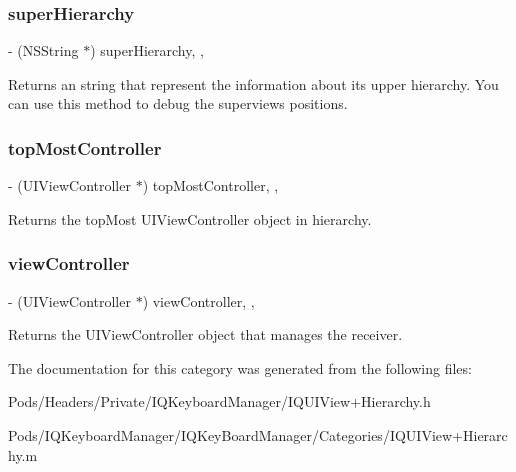 \subsubsection{\texorpdfstring{super\+Hierarchy}{superHierarchy}}
{\footnotesize\ttfamily -\/ (N\+S\+String $\ast$) super\+Hierarchy\hspace{0.3cm}{\ttfamily [read]}, {\ttfamily [nonatomic]}, {\ttfamily [copy]}}

Returns an string that represent the information about it\textquotesingle{}s upper hierarchy. You can use this method to debug the superview\textquotesingle{}s positions. \mbox{\label{category_u_i_view_07_i_q___u_i_view___hierarchy_08_afa4722598f368a57d40b54ab60332604}} 
\subsubsection{\texorpdfstring{top\+Most\+Controller}{topMostController}}
{\footnotesize\ttfamily -\/ (U\+I\+View\+Controller $\ast$) top\+Most\+Controller\hspace{0.3cm}{\ttfamily [read]}, {\ttfamily [nonatomic]}, {\ttfamily [strong]}}

Returns the top\+Most U\+I\+View\+Controller object in hierarchy. \mbox{\label{category_u_i_view_07_i_q___u_i_view___hierarchy_08_a3b2875c16bd6e5e31ee571c1a0236dac}} 
\subsubsection{\texorpdfstring{view\+Controller}{viewController}}
{\footnotesize\ttfamily -\/ (U\+I\+View\+Controller $\ast$) view\+Controller\hspace{0.3cm}{\ttfamily [read]}, {\ttfamily [nonatomic]}, {\ttfamily [strong]}}

Returns the U\+I\+View\+Controller object that manages the receiver. 

The documentation for this category was generated from the following files\+:\begin{DoxyCompactItemize}
\item 
Pods/\+Headers/\+Private/\+I\+Q\+Keyboard\+Manager/I\+Q\+U\+I\+View+\+Hierarchy.\+h\item 
Pods/\+I\+Q\+Keyboard\+Manager/\+I\+Q\+Key\+Board\+Manager/\+Categories/I\+Q\+U\+I\+View+\+Hierarchy.\+m\end{DoxyCompactItemize}

